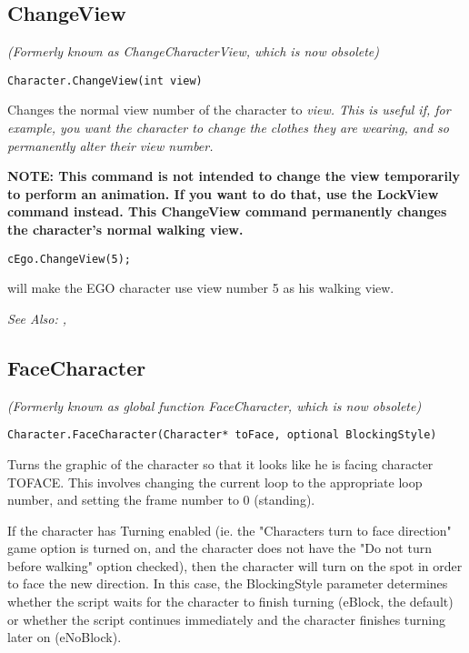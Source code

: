 \subsection{ChangeView}\label{Character.ChangeView}%

\it{(Formerly known as ChangeCharacterView, which is now obsolete)}

\begin{verbatim}
Character.ChangeView(int view)
\end{verbatim}
Changes the normal view number of the character to \it{view}. This is
useful if, for example, you want the character to change the clothes
they are wearing, and so permanently alter their view number.

\bf{NOTE:} This command is \bf{not} intended to change the view temporarily to
perform an animation. If you want to do that, use the LockView command instead. This
ChangeView command permanently changes the character's normal walking view.

\begin{verbatim}
cEgo.ChangeView(5);
\end{verbatim}
will make the EGO character use view number 5 as his walking view.

\it{See Also:} ,


\subsection{FaceCharacter}\label{Character.FaceCharacter}%

\it{(Formerly known as global function FaceCharacter, which is now obsolete)}

\begin{verbatim}
Character.FaceCharacter(Character* toFace, optional BlockingStyle)
\end{verbatim}
Turns the graphic of the character so that it looks like he is facing
character TOFACE. This involves changing the current loop to the appropriate
loop number, and setting the frame number to 0 (standing).

If the character has Turning enabled (ie. the "Characters turn to face direction" game
option is turned on, and the character does not have the "Do not turn before walking"
option checked), then the character will turn on the spot in order to face the new direction.
In this case, the BlockingStyle parameter determines whether the script waits for the
character to finish turning (eBlock, the default) or whether the script continues immediately
and the character finishes turning later on (eNoBlock).

